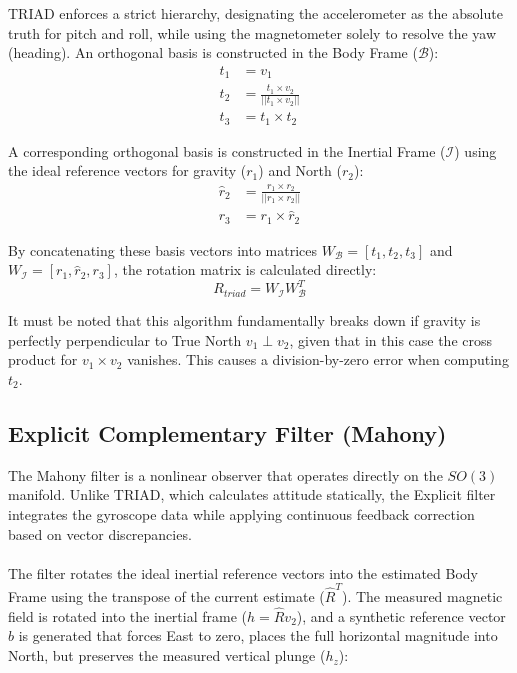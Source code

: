 \documentclass{article}
\begin{document}
TRIAD enforces a strict hierarchy, designating the accelerometer as the absolute truth for pitch and roll, while using the magnetometer solely to resolve the yaw (heading). An orthogonal basis is constructed in the Body Frame ($\mathcal{B}$):
\begin{align*}
t_1 &= v_1 \\
t_2 &= \frac{t_1 \times v_2}{||t_1 \times v_2||} \\
t_3 &= t_1 \times t_2
\end{align*}

A corresponding orthogonal basis is constructed in the Inertial Frame ($\mathcal{I}$) using the ideal reference vectors for gravity ($r_1$) and North ($r_2$):
\begin{align*}
\hat{r}_2 &= \frac{r_1 \times r_2}{||r_1 \times r_2||} \\
r_3 &= r_1 \times \hat{r}_2
\end{align*}

By concatenating these basis vectors into matrices $W_\mathcal{B} = [t_1, t_2, t_3]$ and $W_\mathcal{I} = [r_1, \hat{r}_2, r_3]$, the rotation matrix is calculated directly:
\begin{equation}
    R_{triad} = W_\mathcal{I} W_\mathcal{B}^T
\end{equation}

It must be noted that this algorithm fundamentally breaks down if gravity is perfectly perpendicular to True North $v_1 \perp v_2$, given that in this case the cross product for $v_1 \times v_2$ vanishes. This causes a division-by-zero error when computing $t_2$.

\subsection{Explicit Complementary Filter (Mahony)}

The Mahony filter is a nonlinear observer that operates directly on the $SO(3)$ manifold. Unlike TRIAD, which calculates attitude statically, the Explicit filter integrates the gyroscope data while applying continuous feedback correction based on vector discrepancies.\\
\\
The filter rotates the ideal inertial reference vectors into the estimated Body Frame using the transpose of the current estimate ($\hat{R}^T$). The measured magnetic field is rotated into the inertial frame ($h = \hat{R}v_2$), and a synthetic reference vector $b$ is generated that forces East to zero, places the full horizontal magnitude into North, but preserves the measured vertical plunge ($h_z$):
\end{document}

